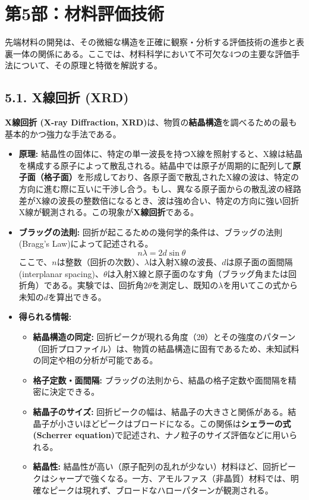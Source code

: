 \documentclass[11pt,a4paper]{ltjsarticle}
\begin{document}
\section*{第5部：材料評価技術}

先端材料の開発は、その微細な構造を正確に観察・分析する評価技術の進歩と表裏一体の関係にある。ここでは、材料科学において不可欠な4つの主要な評価手法について、その原理と特徴を解説する。

\subsection*{5.1. X線回折 (XRD)}

\textbf{X線回折 (X-ray Diffraction, XRD)}は、物質の\textbf{結晶構造}を調べるための最も基本的かつ強力な手法である。

\begin{itemize}
\item \textbf{原理:} 結晶性の固体に、特定の単一波長を持つX線を照射すると、X線は結晶を構成する原子によって散乱される。結晶中では原子が周期的に配列して\textbf{原子面（格子面）}を形成しており、各原子面で散乱されたX線の波は、特定の方向に進む際に互いに干渉し合う。もし、異なる原子面からの散乱波の経路差がX線の波長の整数倍になるとき、波は強め合い、特定の方向に強い回折X線が観測される。この現象が\textbf{X線回折}である。
\item \textbf{ブラッグの法則:} 回折が起こるための幾何学的条件は、ブラッグの法則 (Bragg's Law)によって記述される。
\[ n\lambda=2d\sin\theta \]
ここで、$n$は整数（回折の次数）、$\lambda$は入射X線の波長、$d$は原子面の面間隔 (interplanar spacing)、$\theta$は入射X線と原子面のなす角（ブラッグ角または回折角）である。実験では、回折角$2\theta$を測定し、既知の$\lambda$を用いてこの式から未知の$d$を算出できる。
\item \textbf{得られる情報:}
\begin{itemize}
\item \textbf{結晶構造の同定:} 回折ピークが現れる角度（2θ）とその強度のパターン（回折プロファイル）は、物質の結晶構造に固有であるため、未知試料の同定や相の分析が可能である。
\item \textbf{格子定数・面間隔:} ブラッグの法則から、結晶の格子定数や面間隔を精密に決定できる。
\item \textbf{結晶子のサイズ:} 回折ピークの幅は、結晶子の大きさと関係がある。結晶子が小さいほどピークはブロードになる。この関係は\textbf{シェラーの式 (Scherrer equation)}で記述され、ナノ粒子のサイズ評価などに用いられる。
\item \textbf{結晶性:} 結晶性が高い（原子配列の乱れが少ない）材料ほど、回折ピークはシャープで強くなる。一方、アモルファス（非晶質）材料では、明確なピークは現れず、ブロードなハローパターンが観測される。
\end{itemize}
\end{itemize}
\end{document}
